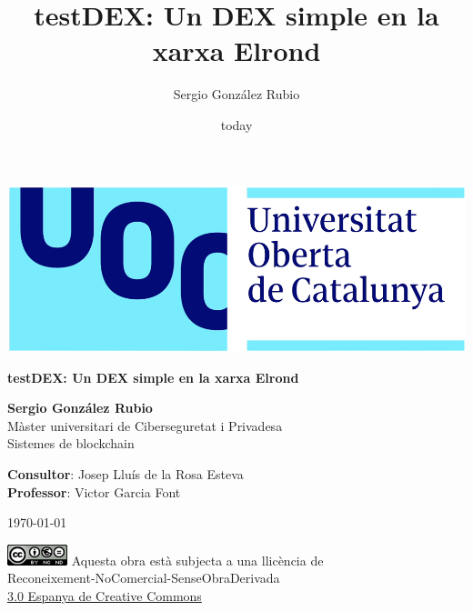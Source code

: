 \documentclass[11pt,a4paper]{article}
\author{Sergio González Rubio}
\title{testDEX: Un DEX simple en la xarxa Elrond}
\date{today}
\begin{document}
\begin{titlepage}
\includegraphics[scale=0.2,right,valign=t]{uoc-logo.png}
\vspace*{\fill}
\begin{flushleft}
{\LARGE \textbf{testDEX: Un DEX simple en la xarxa Elrond}}
\end{flushleft}
\begin{flushleft}
\textbf{Sergio González Rubio}\\
Màster universitari de Ciberseguretat i Privadesa\\
Sistemes de blockchain
\end{flushleft}
\begin{flushleft}
\textbf{Consultor}: Josep Lluís de la Rosa Esteva\\
\textbf{Professor}: Victor Garcia Font
\end{flushleft}
\begin{flushleft}
\today
\end{flushleft}
\end{titlepage}


\begin{titlepage}
\vspace*{\fill}
\begin{flushleft}
\includegraphics[scale=1,left]{licencia-cc.png}
Aquesta obra està subjecta a una llicència de\\
Reconeixement-NoComercial-SenseObraDerivada\\
\href{http://creativecommons.org/licenses/by-nc-nd/3.0/es/}{3.0 Espanya de Creative Commons}
\end{flushleft}
\end{titlepage}
\end{document}
